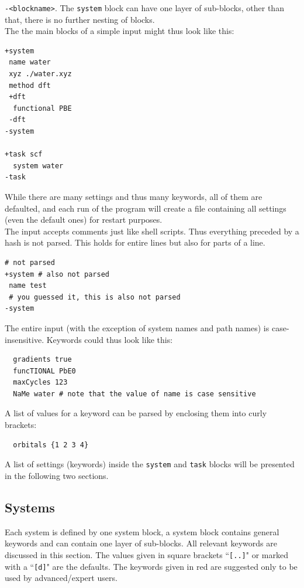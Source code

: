 \documentclass[bibliography=totocnumbered,a4paper,10pt]{scrartcl}
\begin{document}
\texttt{-<blockname>}.
The \texttt{system} block can have one layer of sub-blocks, other than that, there is no further nesting
of blocks.\\
The the main blocks of a simple input might thus look like this:
\begin{lstlisting}
+system
 name water
 xyz ./water.xyz
 method dft
 +dft
  functional PBE
 -dft
-system

+task scf
  system water
-task
\end{lstlisting}
While there are many settings and thus many keywords, all of them are defaulted, and
each run of the program will create a file containing all settings (even the default ones)
for restart purposes.\\
The input accepts comments just like shell scripts.
Thus everything preceded  by a hash is not parsed. 
This holds for entire lines but also for parts of a line.
\begin{lstlisting}
# not parsed
+system # also not parsed
 name test
 # you guessed it, this is also not parsed
-system
\end{lstlisting}
The entire input (with the exception of system names and path names) is case-insensitive.
Keywords could thus look like this:
\begin{lstlisting}
  gradients true
  funcTIONAL PbE0
  maxCycles 123
  NaMe water # note that the value of name is case sensitive
\end{lstlisting}
A list of values for a keyword can be parsed by enclosing them into curly brackets:
\begin{lstlisting}
  orbitals {1 2 3 4}
\end{lstlisting}
A list of settings (keywords) inside the \texttt{system} and \texttt{task} blocks will be 
presented in the following two sections.

\newpage
\subsection{Systems}\label{sec:system}
Each system is defined by one system block, a system block contains general keywords and can contain one layer of sub-blocks.
All relevant keywords are discussed in this section.
The values given in square brackets ``\texttt{[..]}" or marked with a ``\texttt{[d]}" are the defaults.
The keywords given in red are suggested only to be used by advanced/expert users.
\end{document}
